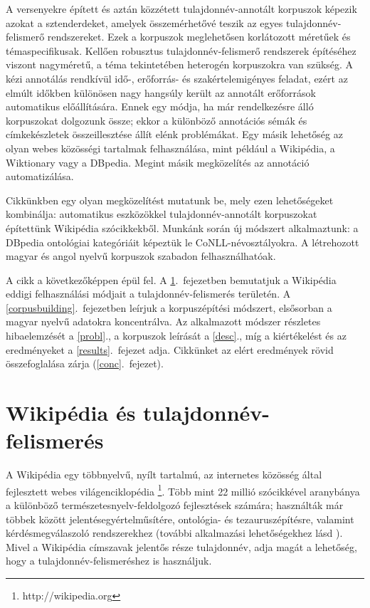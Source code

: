 \documentclass{llncs}
\begin{document}
A versenyekre épített és aztán közzétett tulajdonnév-annotált korpuszok képezik azokat a sztenderdeket, amelyek összemérhetővé teszik az egyes tulajdonnév-felismerő rendszereket. Ezek a korpuszok meglehetősen korlátozott méretűek és témaspecifikusak. Kellően robusztus tulajdonnév-felismerő rendszerek építéséhez viszont nagyméretű, a téma tekintetében heterogén korpuszokra van szükség. A kézi annotálás rendkívül idő-, erőforrás- és szakértelemigényes feladat, ezért az elmúlt időkben különösen nagy hangsúly került az annotált erőforrások automatikus előállítására. Ennek egy módja, ha már rendelkezésre álló korpuszokat dolgozunk össze; ekkor a különböző annotációs sémák és címkekészletek összeillesztése állít elénk problémákat. Egy másik lehetőség az olyan webes közösségi tartalmak felhasználása, mint például a Wikipédia, a Wiktionary vagy a DBpedia. Megint másik megközelítés az annotáció automatizálása. 

Cikkünkben egy olyan megközelítést mutatunk be, mely ezen lehetőségeket kombinálja: automatikus eszközökkel tulajdonnév-annotált korpuszokat építettünk Wikipédia szócikkekből. Munkánk során új módszert alkalmaztunk: a DBpedia ontológiai kategóriáit képeztük le CoNLL-névosztályokra. A létrehozott magyar és angol nyelvű korpuszok szabadon felhasználhatóak. 

A cikk a következőképpen épül fel. A \ref{wiki:ner}.~fejezetben bemutatjuk a Wikipédia eddigi felhasználási módjait a tulajdonnév-felismerés területén. A \ref{corpusbuilding}.~fejezetben leírjuk a korpuszépítési módszert, elsősorban a magyar nyelvű adatokra koncentrálva. Az alkalmazott módszer részletes hibaelemzését a \ref{probl}., a korpuszok leírását a \ref{desc}., míg a kiértékelést és az eredményeket a \ref{results}.~fejezet adja. Cikkünket az elért eredmények rövid összefoglalása zárja (\ref{conc}.~fejezet). 


\section{Wikipédia és tulajdonnév-felismerés}
\label{wiki:ner}

A Wikipédia egy többnyelvű, nyílt tartalmú, az internetes közösség által fejlesztett webes világenciklopédia \footnote{http://wikipedia.org}. Több mint 22 millió szócikkével aranybánya a különböző természetesnyelv-feldolgozó fejlesztések számára; használták már többek között jelentésegyértelműsítére, ontológia- és tezauruszépítésre, valamint kérdésmegválaszoló rendszerekhez (további alkalmazási lehetőségekhez lásd \cite{Medelyan:09}). Mivel a Wikipédia címszavak jelentős része tulajdonnév, adja magát a lehetőség, hogy a tulajdonnév-felismeréshez is használjuk. 
\end{document}
